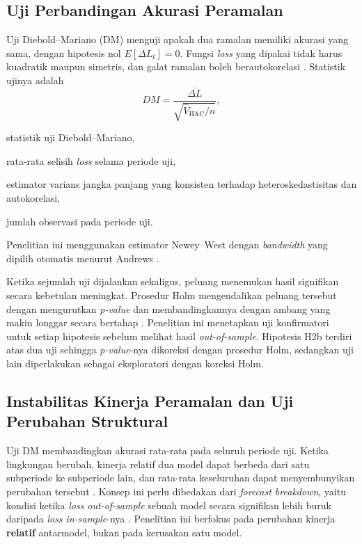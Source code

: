 \subsection{Uji Perbandingan Akurasi Peramalan}
Uji Diebold--Mariano (DM) menguji apakah dua ramalan memiliki akurasi yang
sama, dengan hipotesis nol $E[\Delta L_t] = 0$. Fungsi \textit{loss} yang
dipakai tidak harus kuadratik maupun simetris, dan galat ramalan boleh
berautokorelasi \cite{diebold1995}. Statistik ujinya adalah
\begin{equation}
  DM = \frac{\overline{\Delta L}}{\sqrt{\widehat{V}_{\text{HAC}} / n}},
  \label{eq:dm}
\end{equation}
\begin{keterangan}
  \item[$DM$] statistik uji Diebold--Mariano,
  \item[$\overline{\Delta L}$] rata-rata selisih \textit{loss} selama
    periode uji,
  \item[$\widehat{V}_{\text{HAC}}$] estimator varians jangka panjang yang
    konsisten terhadap heteroskedastisitas dan autokorelasi,
  \item[$n$] jumlah observasi pada periode uji.
\end{keterangan}
Penelitian ini menggunakan estimator Newey--West \cite{newey1987} dengan \textit{bandwidth}
yang dipilih otomatis menurut Andrews \cite{andrews1991}.

Ketika sejumlah uji dijalankan sekaligus, peluang menemukan hasil signifikan
secara kebetulan meningkat. Prosedur Holm mengendalikan peluang tersebut dengan
mengurutkan \textit{p-value} dan membandingkannya dengan ambang yang makin
longgar secara bertahap \cite{holm1979}. Penelitian ini menetapkan uji
konfirmatori untuk setiap hipotesis sebelum melihat hasil
\textit{out-of-sample}. Hipotesis H2b terdiri atas dua uji sehingga
\textit{p-value}-nya dikoreksi dengan prosedur Holm, sedangkan uji lain
diperlakukan sebagai eksploratori dengan koreksi Holm.


\subsection{Instabilitas Kinerja Peramalan dan Uji Perubahan Struktural}
Uji DM membandingkan akurasi rata-rata pada seluruh periode uji. Ketika
lingkungan berubah, kinerja relatif dua model dapat berbeda dari satu
subperiode ke subperiode lain, dan rata-rata keseluruhan dapat menyembunyikan
perubahan tersebut \cite{rossi2013}. Konsep ini perlu dibedakan dari
\textit{forecast breakdown}, yaitu kondisi ketika \textit{loss out-of-sample}
sebuah model secara signifikan lebih buruk daripada \textit{loss in-sample}-nya
\cite{giacomini2009}. Penelitian ini berfokus pada perubahan kinerja
\textbf{relatif} antarmodel, bukan pada kerusakan satu model.

